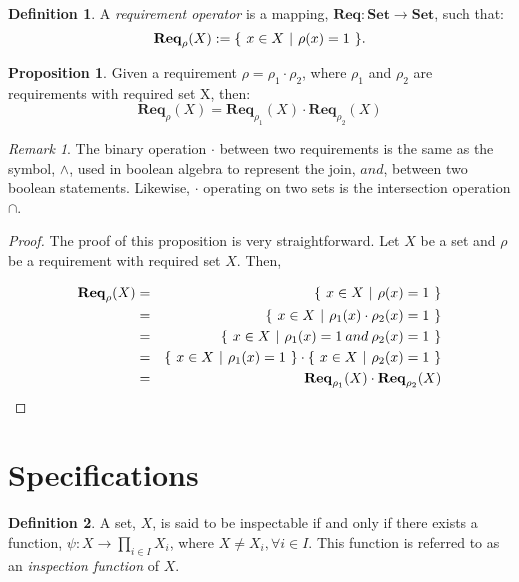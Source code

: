 \documentclass{article}
\theoremstyle{definition}
\newtheorem{definition}{Definition}[section]
\newtheorem{proposition}{Proposition}[section]
\theoremstyle{remark}
\newtheorem*{remark}{Remark}
\newcommand{\func}[3]{#1:#2\rightarrow#3}
\newcommand{\reqop}[2]{\mathbf{Req}_{#1}(#2)}
\newcommand{\setbuild}[3]
{
	\{\hspace{0.05in} 
	#1 \in #2 \hspace{0.05in} 
	| \hspace{0.05in}#3\hspace{0.05in}
	\}	
}
\begin{document}
		\begin{definition}
			A \emph{requirement operator} is a mapping, $\mathbf{Req}: \mathbf{Set} \rightarrow \mathbf{Set}$, such that: \[\reqop{\rho}{X} := \setbuild{x}	{X}{\rho(x) = 1}.\]
		\end{definition}
		
		\begin{proposition}
			Given a requirement $\rho = \rho_{1}\cdot\rho_{2}$, where $\rho_{1}$ and $\rho_{2}$ are requirements with required set X, then: 
			\[
			\reqop{\rho}{X}\stackrel{~}{=}\reqop{\rho_{1}}{X}\cdot\reqop{\rho_{2}}{X}
			\]
		\end{proposition}
		
		\begin{remark}
			The binary operation $\cdot$ between two requirements is the same as the symbol, $\wedge$, used in boolean
 algebra to represent the join, $and$, between two boolean statements. Likewise, $\cdot$ operating on two sets
 is the intersection operation $\cap$. 
		\end{remark}
		
		\begin{proof}
			The proof of this proposition is very straightforward. Let $X$ be a set and $\rho$ be a requirement with
 required set $X$. Then,
			
			\begin{eqnarray}
			\reqop{\rho}{X} & = & \setbuild{x}{X}{\rho(x) = 1}\\ 
			& = & \setbuild{x}{X}{\rho_{1}(x)\cdot\rho_{2}(x) = 1}\\ 
			& = & \setbuild{x}{X}{\rho_{1}(x) = 1 \mathbin{and} \rho_{2}(x) = 1}\\ 
			& = & \setbuild{x}{X}{\rho_{1}(x) = 1}\cdot\setbuild{x}{X}{\rho_{2}(x) = 1}\\
			& = & \reqop{\rho_{1}}{X}\cdot\reqop{\rho_{2}}{X}
			\end{eqnarray}
		\end{proof}
	
	\section{Specifications}
	
		\begin{definition}
			A set, $X$, is said to be inspectable if and only if there exists a function,
 $\func{\psi}{X}{\prod_{i \in I}{X_{i}}}$, where $X \ne X_{i}, \forall i \in I$. This function is referred to as an
 \emph{inspection function} of $X$.
		\end{definition}
		
\end{document}
